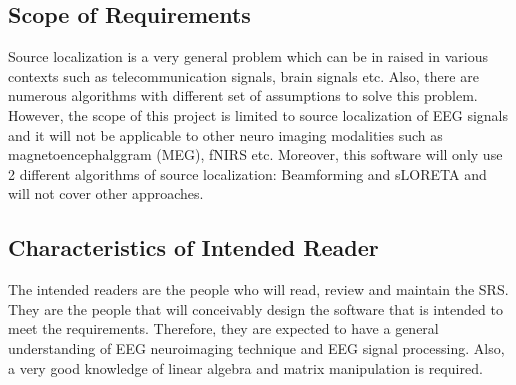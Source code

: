 \documentclass[12pt]{article}
\begin{document}
\subsection{Scope of Requirements} 

Source localization is a very general problem which can be in raised in various contexts such as telecommunication signals, brain signals etc. Also, there are numerous algorithms with different set of assumptions to solve this problem. However, the scope of this project is limited to source localization of EEG signals and it will not be applicable to other neuro imaging modalities such as magnetoencephalggram (MEG), fNIRS etc. Moreover, this software will only use 2 different algorithms of source localization: Beamforming and sLORETA and will not cover other approaches.



\subsection{Characteristics of Intended Reader} \label{sec_IntendedReader}

The intended readers are the people who will read, review and maintain the SRS.  They are the people that will conceivably design the software that is intended to meet the requirements. Therefore, they are expected to have a general understanding of EEG neuroimaging technique and EEG signal processing. Also, a very good knowledge of linear algebra and matrix manipulation is required.
\end{document}
